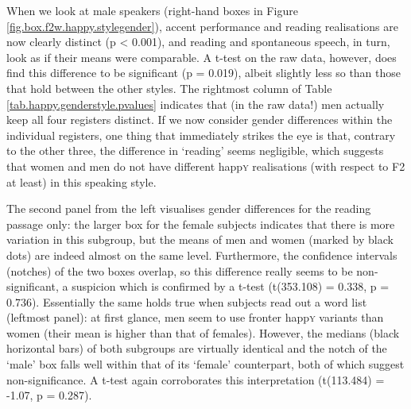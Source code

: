 When we look at male speakers (right-hand boxes in Figure \ref{fig.box.f2w.happy.stylegender}), accent performance and reading realisations are now clearly distinct (p < 0.001), and reading and spontaneous speech, in turn, look as if their means were comparable.
A t-test on the raw data, however, does find this difference to be significant (p = 0.019), albeit slightly less so than those that hold between the other styles.
The rightmost column of Table \ref{tab.happy.genderstyle.pvalues} indicates that (in the raw data!) men actually keep all four registers distinct.
If we now consider gender differences within the individual registers, one thing that immediately strikes the eye is that, contrary to the other three, the difference in `reading' seems negligible, which suggests that women and men do not have different happ\textsc{y} realisations (with respect to F2 at least) in this speaking style.

The second panel from the left visualises gender differences for the reading passage only: the larger box for the female subjects indicates that there is more variation in this subgroup, but the means of men and women (marked by black dots) are indeed almost on the same level.
Furthermore, the confidence intervals (notches) of the two boxes overlap, so this difference really seems to be non-significant, a suspicion which is confirmed by a t-test (t(353.108) = 0.338, p = 0.736).
Essentially the same holds true when subjects read out a word list (leftmost panel): at first glance, men seem to use fronter happ\textsc{y} variants than women (their mean is higher than that of females).
However, the medians (black horizontal bars) of both subgroups are virtually identical and the notch of the `male' box falls well within that of its `female' counterpart, both of which suggest non-significance.
A t-test again corroborates this interpretation (t(113.484) = -1.07, p = 0.287).

